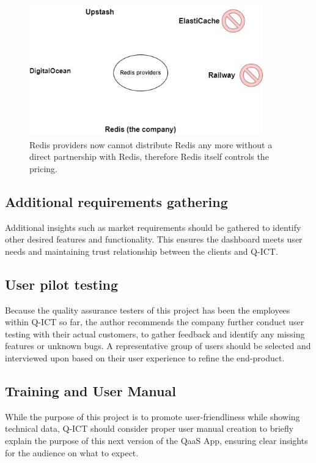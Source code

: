 \begin{figure}[H]
  \centering
  \includegraphics[width=0.9\textwidth]{Figures/Redis Providers.jpg}
  \caption{Redis providers now cannot distribute Redis any more without a direct partnership with Redis, therefore Redis itself controls
    the pricing.}
\end{figure}

\subsection{Additional requirements gathering}

Additional insights such as market requirements should be gathered to identify other desired features and functionality. This ensures the
dashboard meets user needs and maintaining trust relationship between the clients and Q-ICT.

\subsection{User pilot testing}

Because the quality assurance testers of this project has been the employees within Q-ICT so far, the author recommends the company
further conduct user testing with their actual customers, to gather feedback and identify any missing features or unknown bugs.
A representative group of users should be selected and interviewed upon based on their user experience to refine the end-product.

\subsection{Training and User Manual}

While the purpose of this project is to promote user-friendliness while showing technical data, Q-ICT should consider proper user manual
creation to briefly explain the purpose of this next version of the QaaS App, ensuring clear insights for the audience on what to expect.

